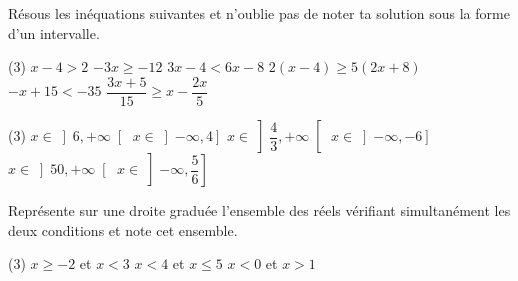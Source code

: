 \documentclass[a4paper, 12pt, parskip=half-, twoside=semi]{scrartcl}
\begin{document}
\begin{appliquer}[points=6]
    Résous les inéquations suivantes et n'oublie pas de noter ta solution sous la forme d'un intervalle.
    \begin{tasks}(3)
        \task $x-4 > 2$
        \task $-3x \ge -12$
        \task $3x-4 < 6x-8$
        \task $2(x-4) \ge 5(2x+8)$
        \task $-x + 15 < -35$
        \task $\dfrac{3x+5}{15}\ge x - \dfrac{2x}{5}$
    \end{tasks}
\end{appliquer}
\begin{solappliquer}
    \begin{tasks}(3)
        \task \(x \in \left]6,+\infty\right[\)
        \task \(x \in \left]-\infty,4\right]\)
        \task \(x \in \left]\dfrac{4}{3},+\infty\right[\)
        \task \(x \in \left]-\infty, -6\right]\)
        \task \(x \in \left]50, +\infty\right[\)
        \task \(x \in \left]-\infty, \dfrac{5}{6}\right]\)
    \end{tasks}
\end{solappliquer}
\begin{appliquer}[points=3]
    Représente sur une droite graduée l'ensemble des réels vérifiant simultanément les deux conditions et note cet ensemble.
    \begin{tasks}(3)
        \task $x \ge -2$ et $x<3$
        \task $x < 4 $ et $x\le 5$
        \task $x < 0$ et $x >1$
    \end{tasks}
\end{appliquer}
\end{document}
